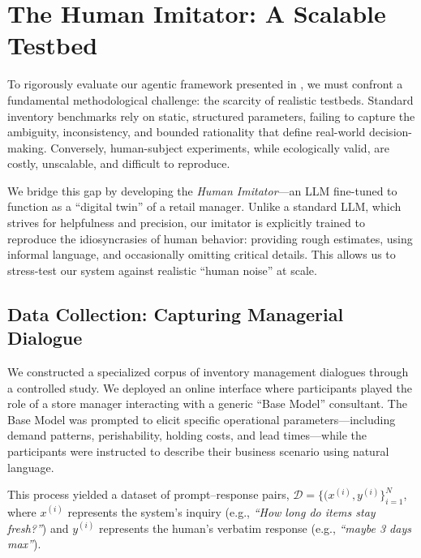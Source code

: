 \documentclass[mnsc,nonblindrev]{informs3_hide}
\begin{document}




    


\section{The Human Imitator: A Scalable Testbed}
\label{sec:imitator}

To rigorously evaluate our agentic framework presented in , we must confront a fundamental methodological challenge: the scarcity of realistic testbeds. Standard inventory benchmarks rely on static, structured parameters, failing to capture the ambiguity, inconsistency, and bounded rationality that define real-world decision-making. Conversely, human-subject experiments, while ecologically valid, are costly, unscalable, and difficult to reproduce.

We bridge this gap by developing the \emph{Human Imitator}—an LLM fine-tuned to function as a ``digital twin'' of a retail manager. Unlike a standard LLM, which strives for helpfulness and precision, our imitator is explicitly trained to reproduce the idiosyncrasies of human behavior: providing rough estimates, using informal language, and occasionally omitting critical details. This allows us to stress-test our system against realistic ``human noise'' at scale.

\subsection{Data Collection: Capturing Managerial Dialogue}

We constructed a specialized corpus of inventory management dialogues through a controlled study. We deployed an online interface where participants played the role of a store manager interacting with a generic ``Base Model'' consultant. The Base Model was prompted to elicit specific operational parameters—including demand patterns, perishability, holding costs, and lead times—while the participants were instructed to describe their business scenario using natural language.

This process yielded a dataset of prompt–response pairs, $\mathcal{D} = \{ (x^{(i)}, y^{(i)} \}_{i=1}^N$, where $x^{(i)}$ represents the system's inquiry (e.g., \emph{``How long do items stay fresh?''}) and $y^{(i)}$ represents the human's verbatim response (e.g., \emph{``maybe 3 days max''}). 
\end{document}
